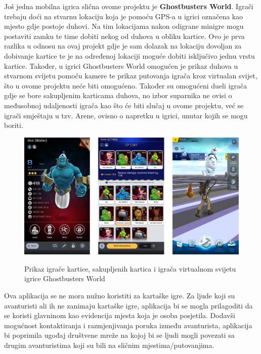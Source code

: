 		\textnormal{Još jedna mobilna igrica slična ovome projektu je \textbf{Ghostbusters World}. Igrači trebaju doći na stvarnu lokaciju koja je pomoću GPS-a u igrici označena kao mjesto gdje postoje duhovi. Na tim lokacijama nakon odigrane minigre mogu postaviti zamku te time dobiti nekog od duhova u obliku kartice. Ovo je prva razlika u odnosu na ovaj projekt gdje je sam dolazak na lokaciju dovoljan za dobivanje kartice te je na određenoj lokaciji moguće dobiti isključivo jednu vrstu kartice. Također, u igrici Ghostbusters World omogućen je prikaz duhova u stvarnom svijetu pomoću kamere te prikaz putovanja igrača kroz virtualan svijet, što u ovome projektu neće biti omogućeno. Također su omogućeni dueli igrača gdje se bore sakupljenim karticama duhova, no izbor suparnika ne ovisi o međusobnoj udaljenosti igrača kao što će biti slučaj u ovome projektu, već se igrači smještaju u tzv. Arene, ovisno o napretku u igrici, unutar kojih se mogu boriti.}
		
		\begin{figure}[H]
			\centering
			\includegraphics[scale=0.45]{slike/Ghostbusters} \\%
			\caption{Prikaz igrače kartice, sakupljenih kartica i igrača virtualnom svijetu igrice Ghostbusters World}
			\label{fig:Ghostbusters} %
		\end{figure}	
		
		\textnormal{Ova aplikacija se ne mora nužno koristiti za kartaške igre. Za ljude koji su avanturisti ali ih ne zanimaju kartaške igre, aplikacija bi se mogla prilagoditi da se koristi glavninom kao evidencija mjesta koja je osoba posjetila. Dodavši mogućnost kontaktiranja i razmjenjivanja poruka između avanturista, aplikacija  bi poprimila ugođaj društvene mreže na kojoj bi se ljudi mogli povezati sa drugim avanturistima koji su bili na sličnim mjestima/putovanjima.}
		
